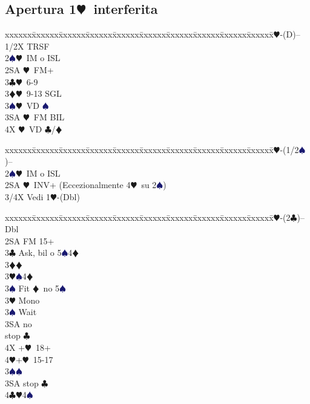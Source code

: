 \documentclass[a4paper,italian]{article}
\newcommand{\BC}{\textcolor{OliveGreen}{$\clubsuit$}}
\newcommand{\BD}{\textcolor{RedOrange}{$\vardiamondsuit$}}
\newcommand{\BH}{\textcolor{Red2}{$\varheartsuit${}}}
\newcommand{\BS}{\textcolor{MidnightBlue}{$\spadesuit${}}}
\newcommand{\pdfh}{\texorpdfstring{\BH{}}{H}}
\newenvironment{bidtable}
{\begin{tabbing}

    xxxxxx\=xxxxxx\=xxxxxx\=xxxxxx\=xxxxxx\=xxxxxx\=xxxxxx\=xxxxxx\=xxxxxx\=xxxxxx\=\kill}
{\end{tabbing} }%
\begin{document}
\begin{multicols}{2}

    \subsection{Apertura 1\pdfh\ interferita}

    \begin{bidtable}
        1\BH-(D)--\+\\
        1/2X \> TRSF\\
        2\BS {}\BH\ IM o ISL\\
        2SA \BH\ FM+\\
        3\BC {}\BH\ 6-9\\
        3\BD {}\BH\ 9-13 SGL\\
        3\BS {}\BH\ VD \BS \\
        3SA \BH\ FM BIL\\
        4X \BH\ VD \BC /\BD \-
    \end{bidtable}
    \bigbreak
    \begin{bidtable}
        1\BH-(1/2\BS)--\+\\
        2\BS {}\BH\ IM o ISL\\
        2SA \BH\ INV+ (Eccezionalmente 4\BH\ su 2\BS )\\
        3/4X \> Vedi 1\BH -(Dbl)\-
    \end{bidtable}
    \bigbreak
    \begin{bidtable}
        1\BH-(2\BC)--\+\\
        Dbl\+\\
        2SA \> FM 15+\+\\
        3\BC \> Ask, bil o 5\BS4\BD\+\\
        3\BD {}\BD \+\\
        3\BH {}\BS 4\BD \\
        3\BS \> Fit \BD\ no 5\BS \-\\
        3\BH \> Mono\+\\
        3\BS \> Wait\+\\
        3SA  no\+\\ stop \BC \-\\
        4X +\BH\ 18+\\
        4\BH {}+\BH\ 15-17\-\-\\
        3\BS {}\BS \\
        3SA  stop \BC \\
        4\BC {}\BH 4\BS \-\\

\end{bidtable}
\end{multicols}
\end{document}
